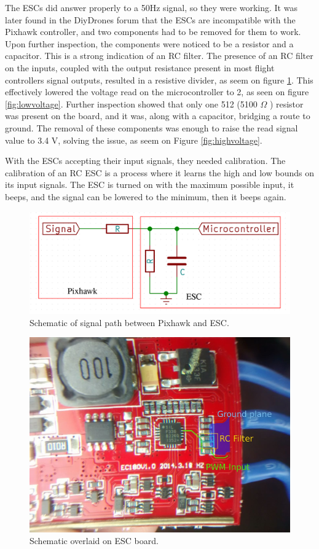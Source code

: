 The ESCs did answer properly to a 50Hz signal, so they were working.
%
It was later found in the DiyDrones\cite{diydronesesc} forum that the ESCs are incompatible with the Pixhawk controller, and two components had to be removed for them to work.
%
Upon further inspection, the components were noticed to be a resistor and a capacitor. This is a strong indication of an RC filter. The presence of an RC filter on the inputs, coupled with the output resistance present in most flight controllers signal outputs, resulted in a resistive divider, as seem on figure \ref{fig:divider}.
This effectively lowered the voltage read on the microcontroller to 2, as seen on figure \ref{fig:lowvoltage}.
Further inspection showed that only one 512 (5100 $\Omega$ ) resistor was present on the board, and it was, along with a capacitor, bridging a route to ground.
The removal of these components was enough to raise the read signal value to 3.4 V, solving the issue, as seem on Figure \ref{fig:highvoltage}.

With the ESCs accepting their input signals, they needed calibration. The calibration of an RC ESC is a process where it learns the high and low bounds on its input signals. The ESC is turned on with the maximum possible input, it beeps, and the signal can be lowered to the minimum, then it beeps again.


\begin{figure}[H]
\centering
  \includegraphics[width=\linewidth]{figs/divider.png}
  \caption{Schematic of signal path between Pixhawk and ESC.}
  \label{fig:divider}
\end{figure}
	
\begin{figure}[H]
\centering
  \includegraphics[width=0.7\linewidth]{figs/escbeforeschematic.jpg}
  \caption{Schematic overlaid on ESC board.}
  \label{fig:divider2}
\end{figure}
	


